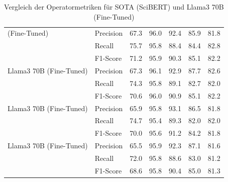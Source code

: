 \begin{table}[!ht]
\begin{tabular}{llrrrrr}
(Fine-Tuned) & Precision & 67.3 & 96.0 & 92.4 & 85.9 & 81.8 \\
 & Recall & 75.7 & 95.8 & 88.4 & 84.4 & 82.8 \\
 & F1-Score & 71.2 & 95.9 & 90.3 & 85.1 & 82.2 \\
\midrule
Llama3 70B
(Fine-Tuned) & Precision & 67.3 & 96.1 & 92.9 & 87.7 & 82.6 \\
 & Recall & 74.3 & 95.8 & 89.1 & 82.7 & 82.0 \\
 & F1-Score & 70.6 & 96.0 & 90.9 & 85.1 & 82.2 \\
\midrule
Llama3 70B
(Fine-Tuned) & Precision & 65.9 & 95.8 & 93.1 & 86.5 & 81.8 \\
 & Recall & 74.7 & 95.4 & 89.3 & 82.0 & 82.0 \\
 & F1-Score & 70.0 & 95.6 & 91.2 & 84.2 & 81.8 \\
\midrule
Llama3 70B
(Fine-Tuned) & Precision & 65.5 & 95.9 & 92.3 & 87.1 & 81.6 \\
 & Recall & 72.0 & 95.8 & 88.6 & 83.0 & 81.2 \\
 & F1-Score & 68.6 & 95.8 & 90.4 & 85.0 & 81.3 \\
\bottomrule
\end{tabular}
\caption{Vergleich der Operatormetriken für SOTA (SciBERT) und Llama3 70B (Fine-Tuned)}
\label{tab:operator_metrics}
\end{table}